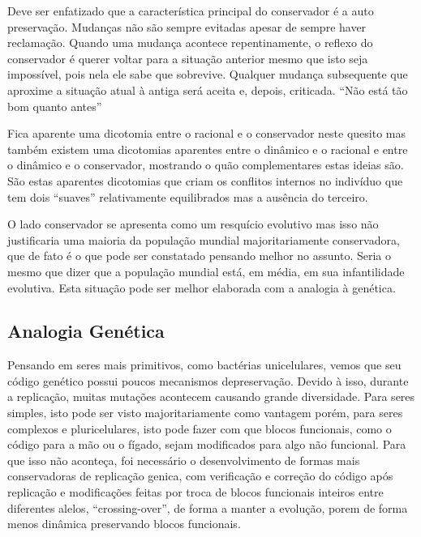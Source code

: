 \documentclass[14pt,portuguese]{extreport}
\begin{document}
      Deve ser enfatizado que a característica principal do conservador é a
      auto preservação. Mudanças não são sempre evitadas apesar de sempre
      haver reclamação. Quando uma mudança acontece repentinamente, o
      reflexo do conservador é querer voltar para a situação anterior mesmo
      que isto seja impossível, pois nela ele sabe que sobrevive. Qualquer
      mudança subsequente que aproxime a situação atual à antiga será
      aceita e, depois, criticada. “Não está tão bom quanto antes”
      
      Fica aparente uma dicotomia entre o racional e o conservador neste
      quesito mas também existem uma dicotomias aparentes entre o
      dinâmico e o racional e entre o dinâmico e o conservador, mostrando o
      quão complementares estas ideias são. São estas aparentes dicotomias
      que criam os conflitos internos no indivíduo que tem dois “suaves”
      relativamente equilibrados mas a ausência do terceiro.
      
      O lado conservador se apresenta como um resquício evolutivo mas
      isso não justificaria uma maioria da população mundial
      majoritariamente conservadora, que de fato é o que pode ser
      constatado pensando melhor no assunto. Seria o mesmo que dizer que
      a população mundial está, em média, em sua infantilidade evolutiva.
      Esta situação pode ser melhor elaborada com a analogia à genética.
      
      \subsection{Analogia Genética}
      
	Pensando em seres mais primitivos, como bactérias unicelulares,
	vemos que seu código genético possui poucos mecanismos depreservação. Devido à isso, durante a replicação, muitas mutações
	acontecem causando grande diversidade. Para seres simples, isto pode
	ser visto majoritariamente como vantagem porém, para seres
	complexos e pluricelulares, isto pode fazer com que blocos funcionais,
	como o código para a mão ou o fígado, sejam modificados para algo não
	funcional. Para que isso não aconteça, foi necessário o desenvolvimento
	de formas mais conservadoras de replicação genica, com verificação e
	correção do código após replicação e modificações feitas por troca de
	blocos funcionais inteiros entre diferentes alelos, “crossing-over”, de
	forma a manter a evolução, porem de forma menos dinâmica
	preservando blocos funcionais.
	
\end{document}
